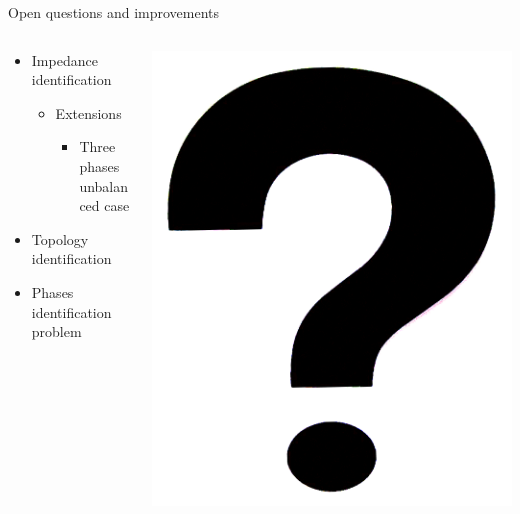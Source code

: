 \documentclass[../main.tex]{subfiles}
\begin{document}
%
%





%
%



\begin{frame}[fragile]{Open questions and improvements}

\begin{columns}[c]

\begin{column}{0.5\linewidth}
\begin{itemize}
\item Impedance identification
\begin{itemize}
\item Extensions
\begin{itemize}
\item Three phases unbalanced case
\end{itemize}
\end{itemize}
\item Topology identification
\item Phases identification problem 
\end{itemize}
\end{column}

\begin{column}{0.5\linewidth}
\centering
\includegraphics[scale=0.1]{pics/Question_Mark.png}
\end{column}
\end{columns}


\end{frame}
\end{document}
